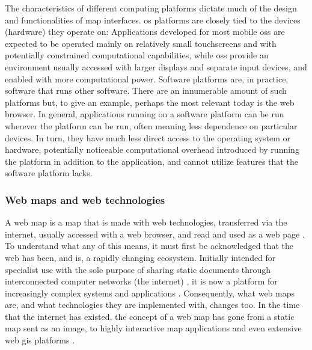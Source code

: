 The characteristics of different computing platforms
dictate much of the design and functionalities of map interfaces.
\acrshort{os} platforms are closely tied to
the devices (hardware) they operate on:
Applications developed for most mobile \acrshort{os}s
are expected to be operated mainly on relatively small touchscreens and
with potentially constrained computational capabilities,
while  \acrshort{os}s
provide an environment usually accessed with larger displays and
separate input devices, and enabled with more computational power.
Software platforms are, in practice, software that runs other software.
There are an innumerable amount of such platforms but,
to give an example, perhaps the most relevant today is the web browser.
In general, applications running on a software platform can be run wherever
the platform can be run, often meaning less dependence on particular devices.
In turn, they have much less direct access to the operating system or hardware,
potentially noticeable computational overhead introduced by running the platform
in addition to the application,
and cannot utilize features that the software platform lacks.



\subsubsection{Web maps and web technologies}
\label{sec:web maps}

A web map is a map that is made with web technologies,
transferred via the internet,
usually accessed with a web browser,
and read and used as a web page \parencite{sac2017}.
To understand what any of this means,
it must first be acknowledged that
the web has been, and is, a rapidly changing ecosystem.
Initially intended for specialist use with the sole purpose of
sharing static documents through
interconnected computer networks (the internet) \parencite{ber1994},
it is now a platform for increasingly complex systems and applications
\parencite{mik2019}.
Consequently, what web maps are,
and what technologies they are implemented with, changes too.
In the time that the internet has existed,
the concept of a web map has gone
from a static map sent as an image, to
highly interactive map applications
and even extensive web \acrshort{gis} platforms \parencite{vee2017}.

